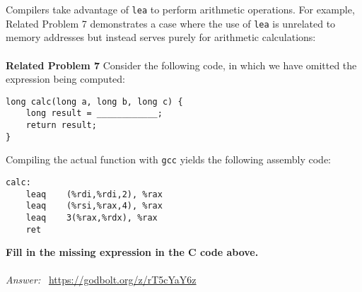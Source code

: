 %
Compilers take advantage of \texttt{lea} to perform arithmetic operations. For 
example, Related Problem 7 demonstrates a case where the use of \texttt{lea} is 
unrelated to memory addresses but instead serves purely for arithmetic calculations: \\
\\
%
\noindent\textbf{Related Problem 7}
%
Consider the following code, in which we have omitted the expression being computed:
%
\begin{verbatim}
long calc(long a, long b, long c) {
    long result = ____________;
    return result;
}
\end{verbatim}
%
Compiling the actual function with \texttt{gcc} yields the following assembly code:
%
\begin{verbatim}
calc:
    leaq    (%rdi,%rdi,2), %rax
    leaq    (%rsi,%rax,4), %rax
    leaq    3(%rax,%rdx), %rax
    ret
\end{verbatim}
%
\textbf{Fill in the missing expression in the C code above.} \\
\\
\textit{Answer: }~\url{https://godbolt.org/z/rT5cYaY6z}
%
